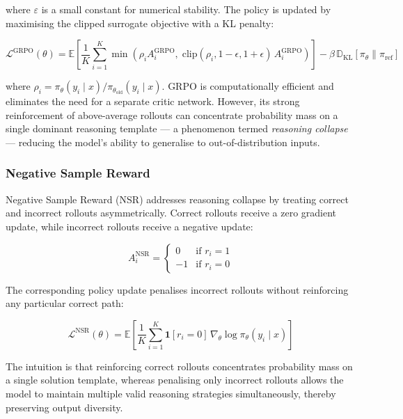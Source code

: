 \documentclass{iutbscthesis}
\begin{document}
\noindent where $\varepsilon$ is a small constant for numerical stability. The policy is updated
by maximising the clipped surrogate objective with a KL penalty:

\begin{equation}
    \mathcal{L}^{\text{GRPO}}(\theta) = \mathbb{E}\!\left[
        \frac{1}{K}\sum_{i=1}^{K}\min\!\left(
            \rho_i A_i^{\text{GRPO}},\;
            \text{clip}(\rho_i, 1{-}\epsilon, 1{+}\epsilon)\, A_i^{\text{GRPO}}
        \right)
    \right] - \beta\, \mathbb{D}_{\text{KL}}[\pi_\theta \| \pi_{\text{ref}}]
\end{equation}

\noindent where $\rho_i = \pi_\theta(y_i \mid x) / \pi_{\theta_{\text{old}}}(y_i \mid x)$.
GRPO is computationally efficient and eliminates the need for a separate critic
network. However, its strong reinforcement of above-average rollouts can concentrate
probability mass on a single dominant reasoning template — a phenomenon termed
\textit{reasoning collapse} — reducing the model's ability to generalise to
out-of-distribution inputs.

\subsubsection{Negative Sample Reward}

Negative Sample Reward (NSR) \cite{yu2025dapo} addresses reasoning collapse by
treating correct and incorrect rollouts asymmetrically. Correct rollouts receive a zero
gradient update, while incorrect rollouts receive a negative update:

\begin{equation}
    A_i^{\text{NSR}} = \begin{cases}
        0   & \text{if } r_i = 1 \\
        -1  & \text{if } r_i = 0
    \end{cases}
\end{equation}

The corresponding policy update penalises incorrect rollouts without reinforcing any
particular correct path:

\begin{equation}
    \mathcal{L}^{\text{NSR}}(\theta) = \mathbb{E}\!\left[
        \frac{1}{K}\sum_{i=1}^{K} \mathbf{1}[r_i = 0]\,
        \nabla_\theta \log \pi_\theta(y_i \mid x)
    \right]
\end{equation}

The intuition is that reinforcing correct rollouts concentrates probability mass on a
single solution template, whereas penalising only incorrect rollouts allows the model
to maintain multiple valid reasoning strategies simultaneously, thereby preserving
output diversity.
\end{document}

